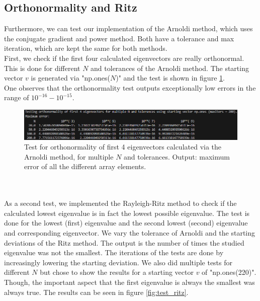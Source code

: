 \documentclass[11pt, letterpaper, onecolumn]{article}
\begin{document}
	
	\subsection{Orthonormality and Ritz}
	Furthermore, we can test our implementation of the Arnoldi method, which uses the conjugate gradient and power method. Both have a tolerance and max iteration, which are kept the same for both methods.\\
	First, we check if the first four calculated eigenvectors are really orthonormal. This is done for different $N$ and tolerances of the Arnoldi method. The starting vector $v$ is generated via "np.ones($N$)" and the test is shown in figure \ref{fig:test_orth}.\\
	One observes that the orthonormality test outputs exceptionally low errors in the range of $10^{-16}-10^{-15}$.
	\begin{figure} [h] 
	\begin{center}	
	\includegraphics[width=19cm]{"test_eigen_orth-tol.png"}
	\caption{Test for orthonormality of first 4 eigenvectors calculated via the Arnoldi method, for multiple $N$ and tolerances. Output: maximum error of all the different array elements.} \label{fig:test_orth}
	\end{center}
	\end{figure}
	\\
	\\
	As a second test, we implemented the Rayleigh-Ritz method to check if the calculated lowest eigenvalue is in fact the lowest possible eigenvalue. The test is done for the lowest (first) eigenvalue and the second lowest (second) eigenvalue and corresponding eigenvector. We vary the tolerance of Arnoldi and the starting deviations of the Ritz method. The output is the number of times the studied eigenvalue was not the smallest. The iterations of the tests are done by increasingly lowering the starting deviation. We also did multiple tests for different $N$ but chose to show the results for a starting vector $v$ of "np.ones(220)". Though, the important aspect that the first eigenvalue is always the smallest was always true. The results can be seen in figure \ref{fig:test_ritz}.
\end{document}
